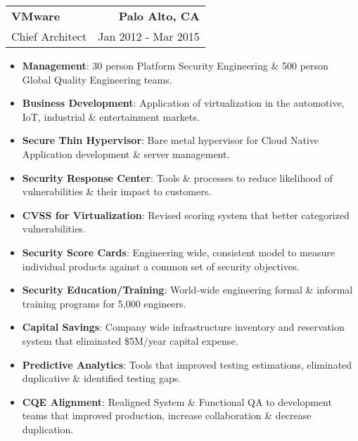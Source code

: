 \documentclass[letterpaper,11pt]{article}
\makeatletter
\newcommand{\resumeSubheading}[4]{
    \item
    \begin{tabular*}{1.0\textwidth}[t]{l@{\extracolsep{\fill}}r}
      \textbf{#1} & \textbf{#2} \\
      {#3} & {#4}
    \end{tabular*}\vspace{-5pt}
  }
\newcommand{\resumeItem}[2]{\item{{\textbf{\small#1}}: {\small#2 \vspace{-1pt}}}}
\newcommand{\resumeItemListStart}{\begin{itemize}}
\newcommand{\resumeItemListEnd}{\end{itemize}}\vspace{-10pt}
\makeatother
\begin{document}
        \resumeSubheading
            {VMware}
            {Palo Alto, CA}
            {Chief Architect}
            {Jan 2012 - Mar 2015}
            \resumeItemListStart
                \resumeItem{Management}{30 person Platform Security Engineering \& 500 person Global Quality Engineering teams.}
                \resumeItem{Business Development}{Application of virtualization in the automotive, IoT, industrial \& entertainment markets.}
                \resumeItem{Secure Thin Hypervisor}{Bare metal hypervisor for Cloud Native Application development \& server management.}
                \resumeItem{Security Response Center}{Tools \& processes to reduce likelihood of vulnerabilities \& their impact to customers.}
                \resumeItem{CVSS for Virtualization}{Revised scoring system that better categorized vulnerabilities.}
                \resumeItem{Security Score Cards}{Engineering wide, consistent model to measure individual products against a common set of security objectives.}
                \resumeItem{Security Education/Training}{World-wide engineering formal \& informal training programs for 5,000 engineers.}
                \resumeItem{Capital Savings}{Company wide infrastructure inventory and reservation system that eliminated \$5M/year capital expense.}
                \resumeItem{Predictive Analytics}{Tools that improved testing estimations, eliminated duplicative \& identified testing gaps.}
                \resumeItem{CQE Alignment}{Realigned System \& Functional QA to development teams that improved production, increase collaboration \& decrease duplication.}
            \resumeItemListEnd
  
\end{document}
